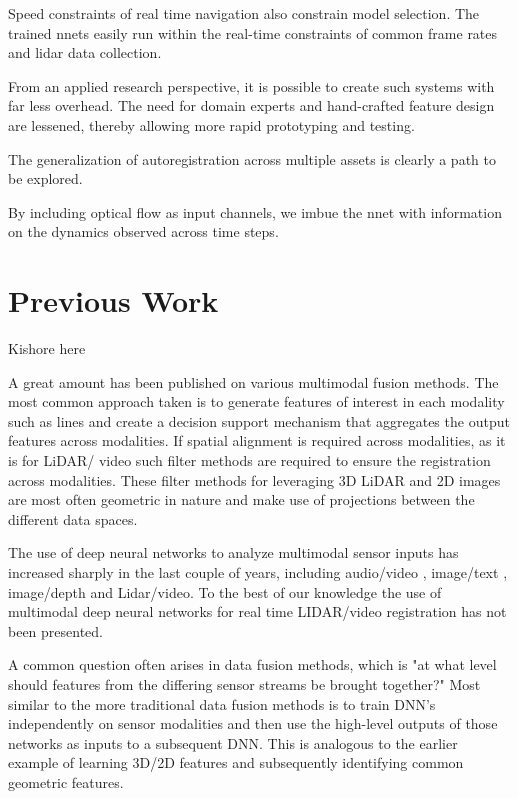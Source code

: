 \documentclass{article}
\begin{document}
Speed constraints of real time navigation also constrain model selection. The trained nnets easily run within the real-time constraints of common frame rates and lidar data collection.

From an applied research perspective, it is possible to create such systems with far less overhead. The need for domain experts and hand-crafted feature design are lessened, thereby allowing more rapid prototyping and testing. 

The generalization of autoregistration across multiple assets is clearly a path to be explored. 

By including optical flow as input channels, we imbue the nnet with information on the dynamics observed across time steps. 

\section{Previous Work} %

Kishore here

A great amount has been published on various multimodal fusion methods. The most common approach taken is to generate features of interest in each modality such as lines and create a decision support mechanism that aggregates the output features across modalities. If spatial alignment is required across modalities, as it is for LiDAR/ video such filter methods \cite{Thrun2011Googles-dr} are required to ensure the registration across modalities. These filter methods for leveraging 3D LiDAR and 2D images are most often geometric in nature and make use of projections between the different data spaces. 

The use of deep neural networks to analyze multimodal sensor inputs  has increased sharply in the last couple of years, including audio/video \cite{Ngiam2011Multimodal} \cite{Kim2013Deep-Learn}, image/text \cite{Srivastava2012Multimodal}, image/depth \cite{Lenz2013Deep-Learn} and Lidar/video. To the best of our knowledge the use of multimodal deep neural networks for real time LIDAR/video registration has not been presented.

A common question often arises in data fusion methods, which is "at what level should features from the differing sensor streams be brought together?" Most similar to the more traditional data fusion methods is to train DNN's independently on sensor modalities and then use the high-level outputs of those networks as inputs to a subsequent DNN. This is analogous to the earlier example of learning 3D/2D features and subsequently identifying common geometric features. 
\end{document}
